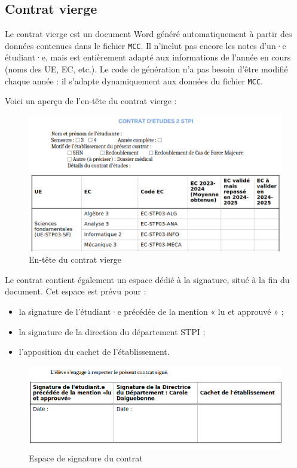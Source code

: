 \subsection{Contrat vierge }
Le contrat vierge est un document Word généré automatiquement à partir des données contenues dans le fichier \texttt{MCC}.  
Il n’inclut pas encore les notes d’un·e étudiant·e, mais est entièrement adapté aux informations de l’année en cours (noms des UE, EC, etc.).  
Le code de génération n’a pas besoin d’être modifié chaque année : il s’adapte dynamiquement aux données du fichier \texttt{MCC}.

\vspace{0.5em}
\noindent Voici un aperçu de l’en-tête du contrat vierge :

\begin{figure}[ht]
    \centering
    \includegraphics[width=\linewidth]{images/contrat_vierge.jpg}
    \caption{En-tête du contrat vierge}
    \label{contrat_vierge}
\end{figure}

\vspace{0.5em}
Le contrat contient également un espace dédié à la signature, situé à la fin du document.  
Cet espace est prévu pour :
\begin{itemize}
    \item la signature de l’étudiant·e précédée de la mention « lu et approuvé » ;
    \item la signature de la direction du département STPI ;
    \item l’apposition du cachet de l’établissement.
\end{itemize}

\begin{figure}[ht]
  \centering
  \includegraphics[width=\linewidth]{images/signature.jpg}
  \caption{Espace de signature du contrat}
  \label{signature}
\end{figure}


